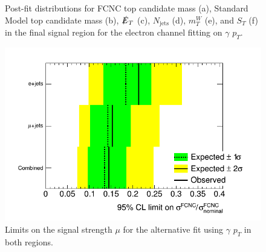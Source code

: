 \begin{figure}[]
\hfil  
{}
\caption{Post-fit distributions for FCNC top candidate mass (a), Standard Model top candidate mass (b), $\slashed{E}_T$ (c), $N_\text{jets}$ (d),  $m_T^W$ (e), and $S_T$ (f) in the final signal region for the electron channel fitting on $\gamma$ $p_T$.}
\end{figure}




\begin{figure}[ht!]
	\centering
	\includegraphics[width=0.5\columnwidth]{../ThesisImages/RegionPlots/FinalRegions/Systematics/PhotonPT/LimitPlot.png}
	\caption{Limits on the signal strength $\mu$ for the alternative fit using $\gamma$ $p_T$ in both regions.
	}
\end{figure}

